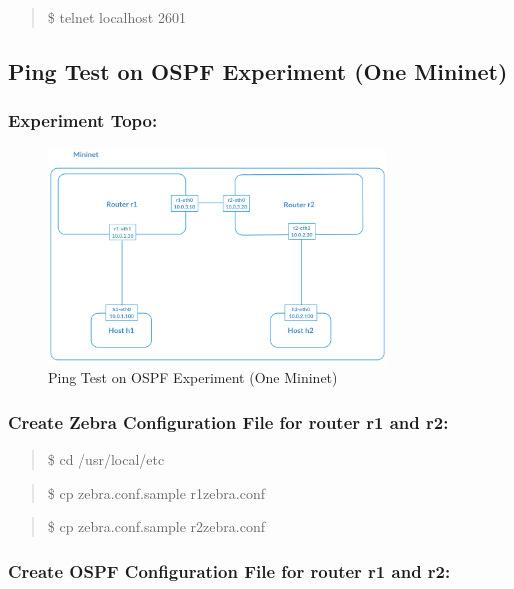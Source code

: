 \begin{quote}
\$ telnet localhost 2601
\end{quote}

\subsection{Ping Test on OSPF Experiment (One Mininet)}\label{run-ospf-experiment-one-mininet}

\subsubsection{Experiment Topo:}\label{experiment-topo}

\begin{figure}[h]
\centering
\includegraphics[width=0.8\textwidth]{./Figure/Topo/Exp1.png}
\caption{Ping Test on OSPF Experiment (One Mininet) \label{fig:Exp1}}
\end{figure}

\subsubsection{Create Zebra Configuration File for router r1 and r2:}\label{create-zebra-configuration-file-for-router-r1-and-r2}

\begin{quote}
\$ cd /usr/local/etc
\end{quote}

\begin{quote}
\$ cp zebra.conf.sample r1zebra.conf
\end{quote}

\begin{quote}
\$ cp zebra.conf.sample r2zebra.conf
\end{quote}

\subsubsection{Create OSPF Configuration File for router r1 and
r2:}\label{create-ospf-configuration-file-for-router-r1-and-r2}

